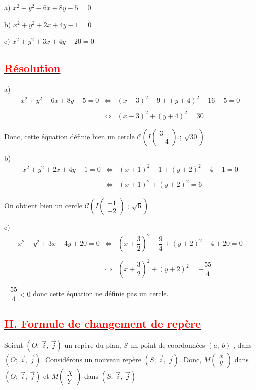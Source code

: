\documentclass[12pt]{article}
\begin{document}
a) $x^{2}+y^{2}-6x+8y-5=0$

b) $x^{2}+y^{2}+2x+4y-1=0$

c) $x^{2}+y^{2}+3x+4y+20=0$
\subsection*{\underline{\textcolor{red}{\textbf{Résolution}}}}
a) $$\begin{array}{rcl} x^{2}+y^{2}-6x+8y-5=0&\Leftrightarrow&(x-3)^{2}-9+(y+4)^{2}-16-5=0\\ \\ &\Leftrightarrow&(x-3)^{2}+(y+4)^{2}=30\end{array}$$

Donc, cette équation définie bien un cercle $\mathcal{C}\left(I\begin{pmatrix} 3 \\ -4\end{pmatrix}\;;\ \sqrt{30}\right)$

b) $$\begin{array}{rcl} x^{2}+y^{2}+2x+4y-1=0&\Leftrightarrow&(x+1)^{2}-1+(y+2)^{2}-4-1=0\\ \\ &\Leftrightarrow&(x+1)^{2}+(y+2)^{2}=6\end{array}$$

On obtient bien un cercle $\mathcal{C}\left(I\begin{pmatrix} -1 \\ -2\end{pmatrix}\;;\ \sqrt{6}\right)$

c) $$\begin{array}{rcl} x^{2}+y^{2}+3x+4y+20=0&\Leftrightarrow&\left(x+\dfrac{3}{2}\right)^{2}-\dfrac{9}{4}+(y+2)^{2}-4+20=0\\ \\ &\Leftrightarrow&\left(x+\dfrac{3}{2}\right)^{2}+(y+2)^{2}=-\dfrac{55}{4}\end{array}$$

$-\dfrac{55}{4}<0$ donc cette équation ne définie pas un cercle.
\subsection*{\underline{\textcolor{red}{\textbf{II. Formule de changement de repère}}}}
Soient $(O;\  \vec{i},\  \vec{j})$ un repère du plan, $S$ un point de coordonnées $(a,\ b)$ , dans $(O;\  \vec{i},\  \vec{j}).$
	Considérons un nouveau repère $(S;\  \vec{i},\  \vec{j}).$
	Donc, $M\begin{pmatrix}
	x\\
	y
	\end{pmatrix}$ dans $(O;\  \vec{i},\  \vec{j})$ et $M\begin{pmatrix}
	X\\
	Y
	\end{pmatrix}$ dans $(S;\  \vec{i},\  \vec{j})$
	
\end{document}
